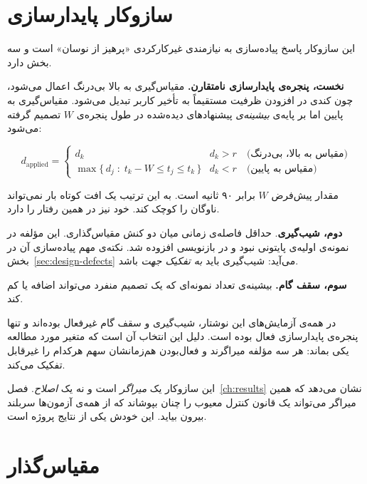 \section{سازوکار پایدارسازی}
\label{sec:design-stabilizer}

این سازوکار پاسخ پیاده‌سازی به نیازمندی غیرکارکردی «پرهیز از نوسان» است و سه بخش دارد.

\textbf{نخست، پنجره‌ی پایدارسازی نامتقارن.} مقیاس‌گیری به بالا بی‌درنگ اعمال می‌شود، چون کندی
در افزودن ظرفیت مستقیماً به تأخیر کاربر تبدیل می‌شود. مقیاس‌گیری به پایین اما بر پایه‌ی
\emph{بیشینه‌ی} پیشنهادهای دیده‌شده در طول پنجره‌ی $W$ تصمیم گرفته می‌شود:

\begin{equation}
\label{eq:stabilize}
d_{\mathrm{applied}} =
\begin{cases}
d_k & d_k > r \quad\text{(مقیاس به بالا، بی‌درنگ)}\\[2mm]
\max\{\, d_j \;:\; t_k - W \le t_j \le t_k \,\} & d_k < r \quad\text{(مقیاس به پایین)}
\end{cases}
\end{equation}

مقدار پیش‌فرض $W$ برابر ۹۰ ثانیه است. به این ترتیب یک افت کوتاه بار نمی‌تواند ناوگان را کوچک
کند. خود  نیز در  همین رفتار را دارد.

\textbf{دوم، شیب‌گیری}. حداقل فاصله‌ی زمانی میان دو کنش مقیاس‌گذاری.
این مؤلفه در نمونه‌ی اولیه‌ی پایتونی نبود و در بازنویسی افزوده شد. نکته‌ی مهم پیاده‌سازی آن
در بخش~\ref{sec:design-defects} می‌آید: شیب‌گیری باید \emph{به تفکیک جهت} باشد.

\textbf{سوم، سقف گام.} بیشینه‌ی تعداد نمونه‌ای که یک تصمیم منفرد می‌تواند اضافه یا کم کند.

در همه‌ی آزمایش‌های این نوشتار، شیب‌گیری و سقف گام غیرفعال بوده‌اند و تنها پنجره‌ی پایدارسازی
فعال بوده است. دلیل این انتخاب آن است که متغیر مورد مطالعه یکی بماند: هر سه مؤلفه میراگرند و
فعال‌بودن هم‌زمانشان سهم هرکدام را غیرقابل تفکیک می‌کند.

این سازوکار یک \emph{میراگر} است و نه یک \emph{اصلاح}. فصل~\ref{ch:results}
نشان می‌دهد که همین میراگر می‌تواند یک قانون کنترل معیوب را چنان بپوشاند که از همه‌ی آزمون‌ها
سربلند بیرون بیاید. این خودش یکی از نتایج پروژه است.

\section{مقیاس‌گذار}
\label{sec:design-scaler}

